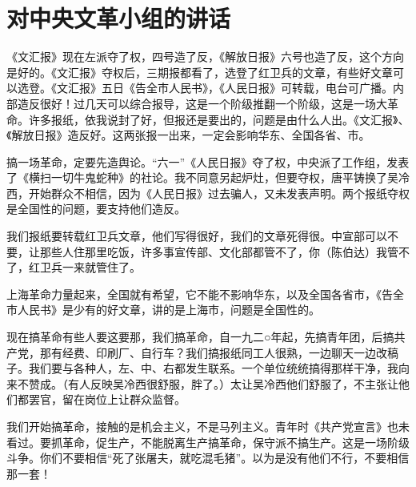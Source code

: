 \section[对中央文革小组的讲话（一九六七年一月九日）]{对中央文革小组的讲话}


《文汇报》现在左派夺了权，四号造了反，《解放日报》六号也造了反，这个方向是好的。《文汇报》夺权后，三期报都看了，选登了红卫兵的文章，有些好文章可以选登。《文汇报》五日《告全市人民书》，《人民日报》可转载，电台可广播。内部造反很好！过几天可以综合报导，这是一个阶级推翻一个阶级，这是一场大革命。许多报纸，依我说封了好，但报还是要出的，问题是由什么人出。《文汇报》、《解放日报》造反好。这两张报一出来，一定会影响华东、全国各省、市。

搞一场革命，定要先造舆论。“六一”《人民日报》夺了权，中央派了工作组，发表了《横扫一切牛鬼蛇种》的社论。我不同意另起炉灶，但要夺权，唐平铸换了吴冷西，开始群众不相信，因为《人民日报》过去骗人，又未发表声明。两个报纸夺权是全国性的问题，要支持他们造反。

我们报纸要转载红卫兵文章，他们写得很好，我们的文章死得很。中宣部可以不要，让那些人住那里吃饭，许多事宣传部、文化部都管不了，你（陈伯达）我管不了，红卫兵一来就管住了。

上海革命力量起来，全国就有希望，它不能不影响华东，以及全国各省市，《告全市人民书》是少有的好文章，讲的是上海市，问题是全国性的。

现在搞革命有些人要这要那，我们搞革命，自一九二○年起，先搞青年团，后搞共产党，那有经费、印刷厂、自行车？我们搞报纸同工人很熟，一边聊天一边改稿子。我们要与各种人，左、中、右都发生联系。一个单位统统搞得那样干净，我向来不赞成。（有人反映吴冷西很舒服，胖了。）太让吴冷西他们舒服了，不主张让他们都罢官，留在岗位上让群众监督。

我们开始搞革命，接触的是机会主义，不是马列主义。青年时《共产党宣言》也未看过。要抓革命，促生产，不能脱离生产搞革命，保守派不搞生产。这是一场阶级斗争。你们不要相信“死了张屠夫，就吃混毛猪”。以为是没有他们不行，不要相信那一套！


